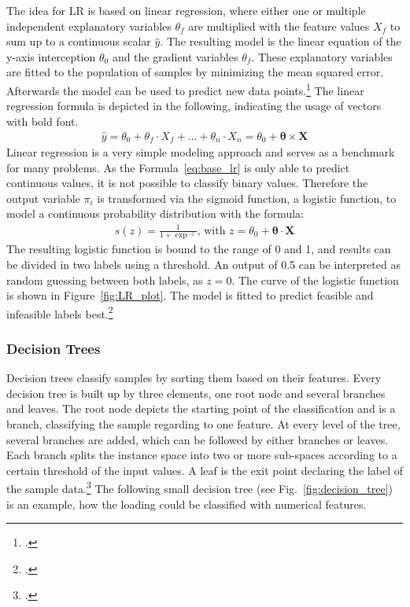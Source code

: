 The idea for \gls{LR} is based on linear regression, where either one or multiple independent explanatory
variables $\theta_f$ are multiplied with the feature values $X_f$ to sum up to a continuous scalar $\hat{y}$.
The resulting model is the linear equation of the y-axis interception $\theta_0$
and the gradient variables $\theta_f$.
These explanatory variables are fitted to the population of samples by minimizing the mean squared
error. Afterwards the model can be used to predict new data points.\footcite[cf.][p. 6f]{nasteski_overview_2017}
The linear regression formula is depicted in the following, indicating the usage of vectors with bold font.
\begin{align}
	\hat{y}=\theta_0+\theta_f \cdot X_f +\dots+\theta_n \cdot X_n = \theta_0 + \bm{\theta} \times \bm{X}
	\label{eq:base_lr}
\end{align}
Linear regression is a very simple modeling approach and serves as a benchmark for many problems. As the Formula~\ref{eq:base_lr} is only able to predict continuous
values, it is not possible to classify binary values. Therefore the output variable $\pi_i$ is transformed via the sigmoid function, a logistic function,
to model a continuous probability distribution with the formula:
\begin{align}
	s(z)=\frac{1}{1+\exp^{-z}},\, \text{with } z = \theta_0 + \bm{\theta} \cdot \bm{X}
	\label{eq:logistic_func}
\end{align}
The resulting logistic function is bound to the range of 0 and 1, and results can be divided
in two labels using a threshold. An output of 0.5 can be interpreted as random
guessing between both labels, as $z=0$. The curve of the logistic function is shown in Figure~\ref{fig:LR_plot}.
The model is fitted to predict feasible and infeasible labels best.\footcite[cf.][]{kirasich_random_2018}



\subsubsection{Decision Trees}
Decision trees classify samples by sorting them based on their features. Every decision tree
is built up by three elements, one root node and several branches and leaves. The root node
depicts the starting point of the classification and is a branch, classifying the sample
regarding to one feature. At every level of the tree, several branches are added, which can be followed
by either branches or leaves. Each branch splits the instance space into two or more sub-spaces
according to a certain threshold of the input values. A leaf is the exit point declaring
the label of the sample data.\footcite[cf.][p. 5f]{nasteski_overview_2017}
The following small decision tree (see Fig.~\ref{fig:decision_tree}) is an example,
how the loading could be classified with numerical features.

